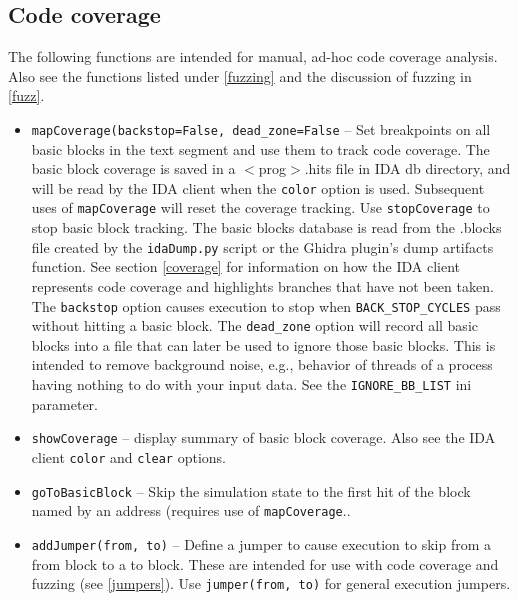 \documentclass[titlepage]{article}
\begin{document}
\subsection{Code coverage}
\label{code-coverage}
The following functions are intended for manual, ad-hoc code coverage analysis.  Also see the functions listed under \ref{fuzzing} and the discussion
of fuzzing in \ref{fuzz}.
\begin{itemize}
\item {\tt mapCoverage(backstop=False, dead\_zone=False} -- Set breakpoints on all basic blocks in the text segment and use them to track code coverage. The basic block coverage is
saved in a $<$prog$>$.hits file in IDA db directory, and will be read by the IDA client when the {\tt color} option is used. Subsequent uses of {\tt mapCoverage}
will reset the coverage tracking.  Use {\tt stopCoverage} to stop basic block tracking.  The basic blocks database is read from the .blocks file created
by the {\tt idaDump.py} script or the Ghidra plugin's dump artifacts function.  See section \ref{coverage} for information on how the IDA client 
represents code coverage and highlights branches that have not been taken.  The {\tt backstop} option causes execution to stop when {\tt BACK\_STOP\_CYCLES} pass without
hitting a basic block.  The {\tt dead\_zone} option will record all basic blocks into a file that can later be used to ignore those basic blocks.  This is intended to
remove background noise, e.g., behavior of threads of a process having nothing to do with your input data.  See the {\tt IGNORE\_BB\_LIST} ini parameter.

\item {\tt showCoverage} -- display summary of basic block coverage.  Also see the IDA client {\tt color} and {\tt clear} options.

\item{\tt goToBasicBlock} -- Skip the simulation state to the first hit of the block named by an address (requires use of {\tt mapCoverage}..

\item{\tt addJumper(from, to)} -- Define a jumper to cause execution to skip from a from block to a to block.  These are intended for use with code coverage and fuzzing (see \ref{jumpers}).
Use {\tt jumper(from, to)} for general execution jumpers.
\end{itemize}
\end{document}
